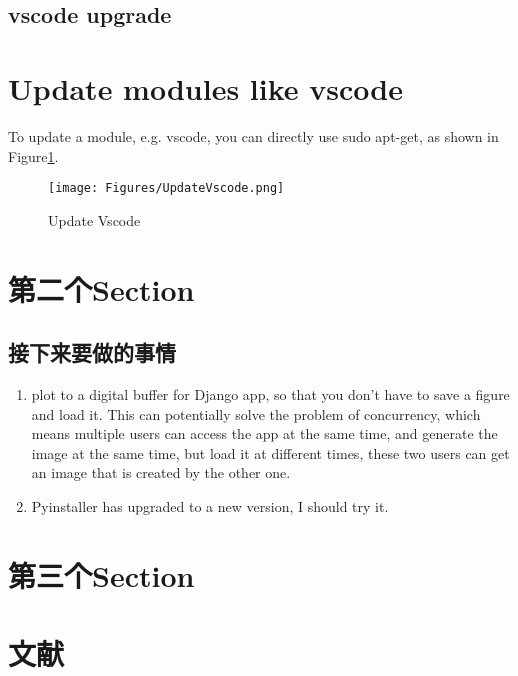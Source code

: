 \documentclass[UTF8,fancyhdr,a4paper]{ctexart}
\begin{document}
\subsection{vscode upgrade}

\section{Update modules like vscode}
To update a module, e.g. vscode, you can directly use sudo apt-get, as shown in Figure\ref{Update Vscode}.
\begin{figure}[h]
      \centering
      \texttt{[image: Figures/UpdateVscode.png]}
      \caption{Update Vscode}
      \label{Update Vscode}
\end{figure}

\section{第二个Section}

\subsection{接下来要做的事情}
\begin{enumerate}
      \item plot to a digital buffer for Django app, so that you don't have to save a figure and load it. This can potentially solve the problem of concurrency, which means multiple users can access the app at the same time, and generate the image at the same time, but load it at different times, these two users can get an image that is created by the other one.
      \item Pyinstaller has upgraded to a new version, I should try it.


\end{enumerate}

\newpage
\section{第三个Section}

\newpage
\section{文献}


\end{document}
